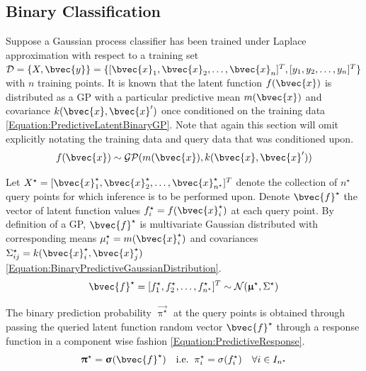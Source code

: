 		\subsection{Binary Classification}
		\label{InformativeSeafloorExploration:MCJPIE:Binary}
		
			Suppose a Gaussian process classifier has been trained under Laplace approximation with respect to a training set $\mathcal{D} = \{X, \bvec{y}\} = \{[ \bvec{x}_{1}, \bvec{x}_{2}, \dots, \bvec{x}_{n}]^{T}, [y_{1}, y_{2}, \dots, y_{n}]^{T}\}$ with $n$ training points. It is known that the latent function $f(\bvec{x})$ is distributed as a GP with a particular predictive mean $m(\bvec{x})$ and covariance $k(\bvec{x}, \bvec{x}')$ once conditioned on the training data \eqref{Equation:PredictiveLatentBinaryGP}. Note that again this section will omit explicitly notating the training data and query data that was conditioned upon. \begin{equation}
				f(\bvec{x}) \sim \mathcal{GP}(m(\bvec{x}), k(\bvec{x}, \bvec{x}'))
			\label{Equation:PredictiveLatentBinaryGP}
			\end{equation}
			
			Let $X^{\star} = [ \bvec{x}^{\star}_{1}, \bvec{x}^{\star}_{2}, \dots, \bvec{x}^{\star}_{n^{\star}}]^{T}$ denote the collection of $n^{\star}$ query points for which inference is to be performed upon. Denote $\bvec{f}^{\star}$ the vector of latent function values $f^{\star}_{i} = f(\bvec{x}^{\star}_{i})$ at each query point. By definition of a GP, $\bvec{f}^{\star}$ is multivariate Gaussian distributed with corresponding means $\mu^{\star}_{i} = m(\bvec{x}^{\star}_{i})$ and covariances $\Sigma^{\star}_{ij} = k(\bvec{x}^{\star}_{i}, \bvec{x}^{\star}_{j})$ \eqref{Equation:BinaryPredictiveGaussianDistribution}. \begin{equation}
				\bvec{f}^{\star} = [f^{\star}_{1}, f^{\star}_{2}, \dots, f^{\star}_{n^{\star}}]^{T} \sim \mathcal{N}(\vec{\upmu}^{\star}, \Sigma^{\star})
			\label{Equation:BinaryPredictiveGaussianDistribution}
			\end{equation}
				
			The binary prediction probability $\vec{\uppi^{\star}}$ at the query points is obtained through passing the queried latent function random vector $\bvec{f}^{\star}$ through a response function in a component wise fashion \eqref{Equation:PredictiveResponse}. \begin{equation}
				\vec{\uppi}^{\star} = \vec{\upsigma}(\bvec{f}^{\star})\mathrm{ \quad i.e. \;\;}\pi^{\star}_{i} = \sigma(f^{\star}_{i}) \quad \forall i \in I_{n^{\star}}
			\label{Equation:PredictiveResponse}
			\end{equation}
			
